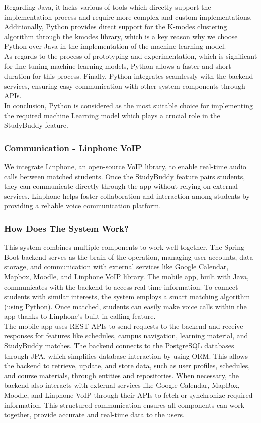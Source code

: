 \documentclass[12pt]{article}
\begin{document}
Regarding Java, it lacks various of tools which directly support the implementation process and require more complex and custom implementations. Additionally, Python provides direct support for the K-modes clustering algorithm through the kmodes library, which is a key reason why we choose Python over Java in the implementation of the machine learning model. \\

As regards to the process of prototyping and experimentation, which is significant for fine-tuning machine learning models, Python allows a faster and short duration for this process. Finally, Python integrates seamlessly with the backend services, ensuring easy communication with other system components through APIs. \\

In conclusion, Python is considered as the most suitable choice for implementing the required machine Learning model which plays a crucial role in the StudyBuddy feature.

\subsubsection{Communication - Linphone VoIP}
We integrate Linphone, an open-source VoIP library, to enable real-time audio calls between matched students. 
Once the StudyBuddy feature pairs students, they can communicate directly through the app without relying on external services. 
Linphone helps foster collaboration and interaction among students by providing a reliable voice communication platform.

\subsubsection{How Does The System Work?}
This system combines multiple components to work well together.
The Spring Boot backend serves as the brain of the operation, managing user accounts, data storage, and communication with external services like Google Calendar, Mapbox, Moodle, and Linphone VoIP library.
The mobile app, built with Java, communicates with the backend to access real-time information. To connect students with similar interests, the system employs a smart matching algorithm (using Python). 
Once matched, students can easily make voice calls within the app thanks to Linphone's built-in calling feature. \\

The mobile app uses REST APIs to send requests to the backend and receive responses for features like schedules, campus navigation, learning material, and StudyBuddy matches. 
The backend connects to the PostgreSQL databases through JPA, which simplifies database interaction by using ORM.
This allows the backend to retrieve, update, and store data, such as user profiles, schedules, and course materials, through entities and repositories.
When necessary, the backend also interacts with external services like Google Calendar, MapBox, Moodle, and Linphone VoIP through their APIs to fetch or synchronize required information.
This structured communication ensures all components can work together, provide accurate and real-time data to the users.\\
\end{document}
